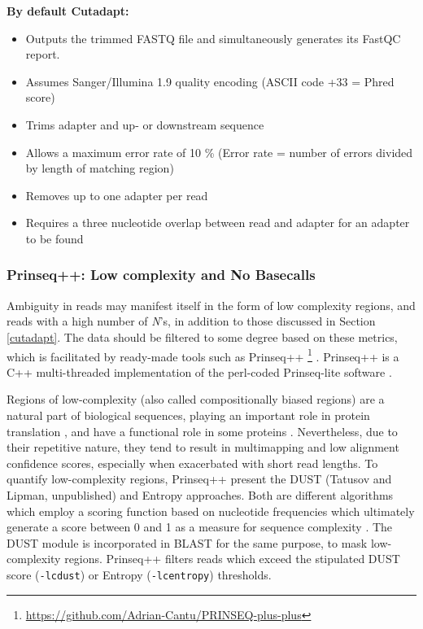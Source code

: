 \textbf{By default Cutadapt:}
\begin{itemize}\itemsep0em
\item Outputs the trimmed FASTQ file and simultaneously generates its FastQC report.
\item Assumes Sanger/Illumina 1.9 quality encoding (ASCII code +33 = Phred score)
\item Trims adapter and up- or downstream sequence
\item Allows a maximum error rate of 10 \% (Error rate = number of errors divided by length of matching region)
\item Removes up to one adapter per read
\item Requires a three nucleotide overlap between read and adapter for an adapter to be found
\end{itemize}


\subsubsection{Prinseq++: Low complexity and No Basecalls}

Ambiguity in reads may manifest itself in the form of low complexity regions, and reads with a high number of \textit{N}'s, in addition to those discussed in Section \ref{cutadapt}. The data should be filtered to some degree based on these metrics, which is facilitated by ready-made tools such as Prinseq++ \footnote{\url{https://github.com/Adrian-Cantu/PRINSEQ-plus-plus}} \citep{prinseq++}. Prinseq++ is a C++ multi-threaded implementation of the perl-coded Prinseq-lite software \citep{schmieder2011quality}. 

Regions of low-complexity (also called compositionally biased regions) are a natural part of biological sequences, playing an important role in protein translation \citep{frugier2010low}, and have a functional role in some proteins \citep{ntountoumi2019low}. Nevertheless, due to their repetitive nature, they tend to result in multimapping and low alignment confidence scores, especially when exacerbated with short read lengths. To quantify low-complexity regions, Prinseq++ present the DUST (Tatusov and Lipman, unpublished) and Entropy approaches. Both are different algorithms which employ a scoring function based on nucleotide frequencies which ultimately generate a score between 0 and 1 as a measure for sequence complexity  \citep{morgulis2006fast}. The DUST module is incorporated in BLAST \citep{altschul1997gapped} for the same purpose, to mask low-complexity regions. Prinseq++ filters reads which exceed the stipulated DUST score (\texttt{-lc\textunderscore dust}) or Entropy (\texttt{-lc\textunderscore entropy}) thresholds.

